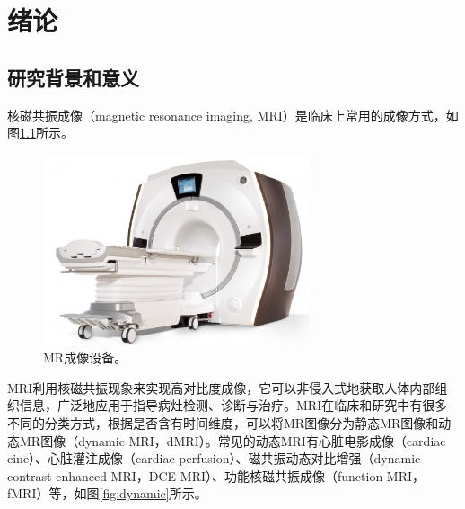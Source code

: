 \chapter{绪论}
\label{chap:introduction}

\section{研究背景和意义}
核磁共振成像\cite{mrireview}（magnetic resonance imaging, MRI）是临床上常用的成像方式，如图\ref{fig:mri}所示。
\begin{figure}[htbp]
\centerline{\includegraphics[width=0.7\textwidth]{img/intro/mri.jpg}}
\caption{MR成像设备。}
\label{fig:mri}
\end{figure}
MRI利用核磁共振现象来实现高对比度成像，它可以非侵入式地获取人体内部组织信息，广泛地应用于指导病灶检测、诊断与治疗。MRI在临床和研究中有很多不同的分类方式，根据是否含有时间维度，可以将MR图像分为静态MR图像和动态MR图像（dynamic MRI，dMRI）。常见的动态MRI有心脏电影成像（cardiac cine）、心脏灌注成像（cardiac perfusion）、磁共振动态对比增强（dynamic contrast enhanced MRI，DCE-MRI）、功能核磁共振成像（function MRI，fMRI）等，如图\ref{fig:dynamic}所示。
